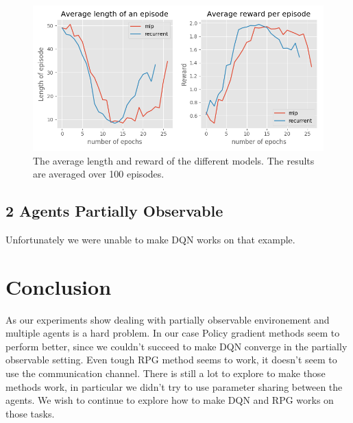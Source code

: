 \documentclass{article} %
\begin{document}
\begin{figure}[h]
\centering
\includegraphics[width=\textwidth]{multiagent_mdp_results.png}
\caption{The average length and reward of the different models. The results are averaged over 100 episodes.}
\end{figure}

\subsection{2 Agents Partially Observable}
Unfortunately we were unable to make DQN works on that example.

\section{Conclusion}
As our experiments show dealing with partially observable environement and multiple agents is a hard problem. In our case Policy gradient methods seem to perform better, since we couldn't succeed to make DQN converge in the partially observable setting. Even tough RPG method seems to work, it doesn't seem to use the communication channel. There is still a lot to explore to make those methods work, in particular we didn't try to use parameter sharing between the agents. We wish to continue to explore how to make DQN and RPG works on those tasks.



\end{document}
